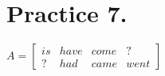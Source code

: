 \documentclass[a4paper,12pt]{article}
\begin{document}
%
%
\section*{Practice 7.}
$A=\begin{bmatrix}
                              is & have& come& ?\\
                              ? & had& came &went
                             \end{bmatrix}$
\end{document}
